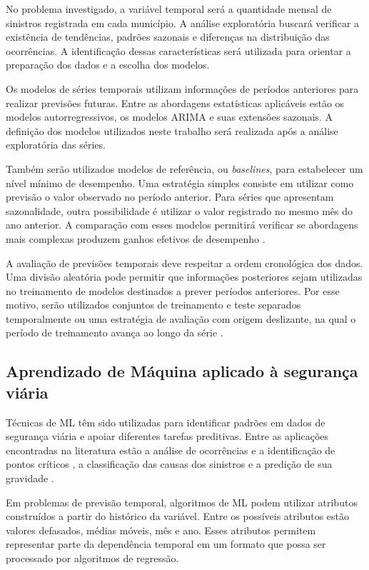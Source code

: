 \documentclass[12pt]{article}
\begin{document}
No problema investigado, a variável temporal será a quantidade mensal de sinistros registrada em cada município. A análise exploratória buscará verificar a existência de tendências, padrões sazonais e diferenças na distribuição das ocorrências. A identificação dessas características será utilizada para orientar a preparação dos dados e a escolha dos modelos.

Os modelos de séries temporais utilizam informações de períodos anteriores para realizar previsões futuras. Entre as abordagens estatísticas aplicáveis estão os modelos autorregressivos, os modelos ARIMA e suas extensões sazonais. A definição dos modelos utilizados neste trabalho será realizada após a análise exploratória das séries.

Também serão utilizados modelos de referência, ou \textit{baselines}, para estabelecer um nível mínimo de desempenho. Uma estratégia simples consiste em utilizar como previsão o valor observado no período anterior. Para séries que apresentam sazonalidade, outra possibilidade é utilizar o valor registrado no mesmo mês do ano anterior. A comparação com esses modelos permitirá verificar se abordagens mais complexas produzem ganhos efetivos de desempenho \cite{hyndman2021forecasting}.

A avaliação de previsões temporais deve respeitar a ordem cronológica dos dados. Uma divisão aleatória pode permitir que informações posteriores sejam utilizadas no treinamento de modelos destinados a prever períodos anteriores. Por esse motivo, serão utilizados conjuntos de treinamento e teste separados temporalmente ou uma estratégia de avaliação com origem deslizante, na qual o período de treinamento avança ao longo da série \cite{bergmeir2018crossvalidation,hyndman2021forecasting}.

\subsection{Aprendizado de Máquina aplicado à segurança viária}

Técnicas de ML têm sido utilizadas para identificar padrões em dados de segurança viária e apoiar diferentes tarefas preditivas. Entre as aplicações encontradas na literatura estão a análise de ocorrências e a identificação de pontos críticos \cite{santos2021machine}, a classificação das causas dos sinistros \cite{silva2024classificacao} e a predição de sua gravidade \cite{mafort2025tecnicas}.

Em problemas de previsão temporal, algoritmos de ML podem utilizar atributos construídos a partir do histórico da variável. Entre os possíveis atributos estão valores defasados, médias móveis, mês e ano. Esses atributos permitem representar parte da dependência temporal em um formato que possa ser processado por algoritmos de regressão.
\end{document}
